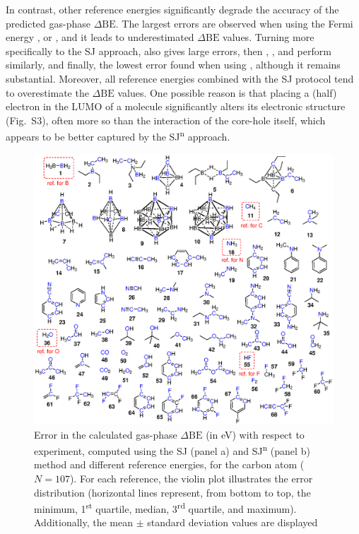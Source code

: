 \documentclass[journal=jpccck,manuscript=article]{achemso}
\def\dbe{\ensuremath{\Delta\text{BE}}}
\begin{document}
In contrast, other reference energies significantly degrade the accuracy of the predicted gas-phase \dbe{}. The largest errors are observed when using the Fermi energy , or , and it leads to underestimated \dbe{} values. 
Turning more specifically to the SJ approach,  also gives large errors, then , , and  perform similarly, and finally, the lowest error found when using \cpx{\phi}, although it remains substantial. Moreover, all reference energies combined with the SJ protocol tend to overestimate the \dbe{} values. One possible reason is that placing a (half) electron in the LUMO of a molecule significantly alters its electronic structure (Fig.~S3), often more so than the interaction of the core-hole itself, which appears to be better captured by the SJ\textsuperscript{n} approach.\cite{taucherFinalStateSimulationsCoreLevel2020}




\begin{figure}
	\centering
	\includegraphics[width=\linewidth]{Figure3}
	\caption{Error in the calculated gas-phase \dbe{}  (in \si{\electronvolt}) with respect to experiment, computed using the SJ (panel a) and SJ\textsuperscript{n} (panel b) method and different reference energies, for the carbon atom ($N=107$). For each reference, the violin plot illustrates the error distribution (horizontal lines represent, from bottom to top, the minimum, 1\textsuperscript{st} quartile, median, 3\textsuperscript{rd} quartile, and maximum). Additionally, the mean $\pm$ standard deviation values are displayed}
	\label{fig:xps_C185_C}
\end{figure}
\end{document}
